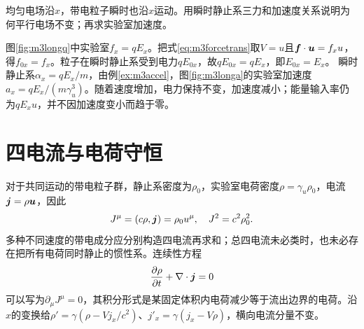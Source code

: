 \begin{example}\label{ex:m3longfield}
均匀电场沿$x$，带电粒子瞬时也沿$x$运动。用瞬时静止系三力和加速度关系说明为何平行电场不变；再求实验室加速度。
\end{example}
\begin{solution}
图\ref{fig:m3longq}中实验室$f_x=qE_x$。把式\eqref{eq:m3forcetrans}取$V=u$且$\bm{f}\cdot\bm{u}=f_xu$，得$f_{0x}=f_x$。粒子在瞬时静止系受到电力$qE_{0x}$，故$qE_{0x}=qE_x$，即$E_{0x}=E_x$。
瞬时静止系$\alpha_x=qE_x/m$，由例\ref{ex:m3accel}，图\ref{fig:m3longa}的实验室加速度$a_x=qE_x/(m\gamma_u^3)$。随着速度增加，电力保持不变，加速度减小；能量输入率仍为$qE_xu$，并不因加速度变小而趋于零。
\end{solution}

\section{四电流与电荷守恒}\label{th:m3current}
对于共同运动的带电粒子群，静止系密度为$\rho_0$，实验室电荷密度$\rho=\gamma_u\rho_0$，电流$\bm{j}=\rho\bm{u}$，因此
\[
 J^\mu=(c\rho,\bm{j})=\rho_0u^\mu,\quad J^2=c^2\rho_0^2.
\]
多种不同速度的带电成分应分别构造四电流再求和；总四电流未必类时，也未必存在把所有电荷同时静止的惯性系。连续性方程
\[
 \frac{\partial\rho}{\partial t}+\nabla\cdot\bm{j}=0
\]
可以写为$\partial_\mu J^\mu=0$，其积分形式是某固定体积内电荷减少等于流出边界的电荷。沿$x$的变换给$\rho'=\gamma(\rho-Vj_x/c^2)$、$j'_x=\gamma(j_x-V\rho)$，横向电流分量不变。

